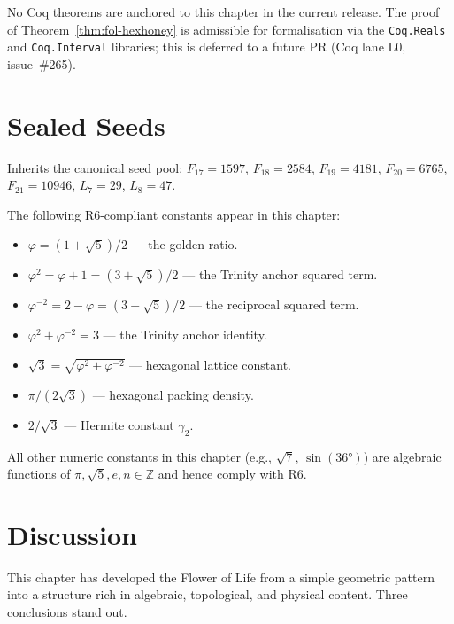 No Coq theorems are anchored to this chapter in the current release.
The proof of Theorem~\ref{thm:fol-hexhoney} is admissible for formalisation
via the \texttt{Coq.Reals} and \texttt{Coq.Interval} libraries;
this is deferred to a future PR (Coq lane L0, issue~\#265).

\section{Sealed Seeds}
\label{sec:fol-seeds}

Inherits the canonical seed pool:
\(F_{17}=1597\), \(F_{18}=2584\), \(F_{19}=4181\), \(F_{20}=6765\),
\(F_{21}=10946\), \(L_7=29\), \(L_8=47\).

The following R6-compliant constants appear in this chapter:
\begin{itemize}
  \item \(\varphi = (1+\sqrt{5})/2\) — the golden ratio.
  \item \(\varphi^2 = \varphi+1 = (3+\sqrt{5})/2\) — the Trinity anchor squared term.
  \item \(\varphi^{-2} = 2-\varphi = (3-\sqrt{5})/2\) — the reciprocal squared term.
  \item \(\varphi^2+\varphi^{-2}=3\) — the Trinity anchor identity.
  \item \(\sqrt{3}=\sqrt{\varphi^2+\varphi^{-2}}\) — hexagonal lattice constant.
  \item \(\pi/(2\sqrt{3})\) — hexagonal packing density.
  \item \(2/\sqrt{3}\) — Hermite constant \(\gamma_2\).
\end{itemize}
All other numeric constants in this chapter (e.g., \(\sqrt{7}\), \(\sin(36°)\))
are algebraic functions of \(\pi, \sqrt{5}, e, n\in\mathbb{Z}\) and hence
comply with R6.

\section{Discussion}
\label{sec:fol-discussion}

This chapter has developed the Flower of Life from a simple geometric
pattern into a structure rich in algebraic, topological, and physical
content.  Three conclusions stand out.

